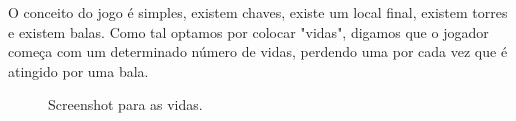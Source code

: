 O conceito do jogo é simples, existem chaves, existe um local final, existem torres e existem balas. Como tal optamos por colocar "vidas", digamos que o jogador começa com um determinado número de vidas, perdendo uma por cada vez que é atingido por uma bala.

\begin{figure}[here]
                 \caption{Screenshot para as vidas.}
                 \label{fig:prototype}
\end{figure}
